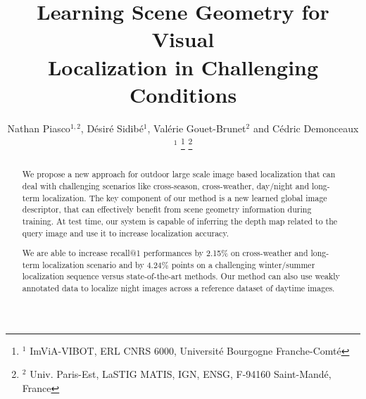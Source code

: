 \documentclass[letterpaper, 10 pt, conference]{ieeeconf}  %
\title{\LARGE \bf
Learning Scene Geometry for Visual\\Localization in Challenging Conditions
}
\author{Nathan Piasco${}^{1,2}$, D\'esir\'e Sidib\'e${}^1$, Val\'erie Gouet-Brunet${}^2$ and C\'edric Demonceaux${}^1$%
\thanks{${}^1$ ImViA-VIBOT, ERL CNRS 6000,  Universit\'e  Bourgogne Franche-Comt\'e}%
\thanks{${}^2$ Univ. Paris-Est, LaSTIG MATIS, IGN, ENSG, F-94160 Saint-Mand\'e, France}%
}
\begin{document}
\newcommand{\norm}[1]{\left\lVert#1\right\rVert}
\newcommand\numberthis{\addtocounter{equation}{1}\tag{\theequation}}

\maketitle
\thispagestyle{empty}
\pagestyle{empty}


\begin{abstract}
We propose a new approach for outdoor large scale image based localization that can deal with challenging scenarios like cross-season, cross-weather, day/night and long-term localization. The key component of our method is a new learned global image descriptor, that can effectively benefit from scene geometry information during training. At test time, our system is capable of inferring the depth map related to the query image and use it to increase localization accuracy.

We are able to increase recall@1 performances by 2.15\% on cross-weather and long-term localization scenario and by 4.24\% points on a challenging winter/summer localization sequence versus state-of-the-art methods. Our method can also use weakly annotated data to localize night images across a reference dataset of daytime images.
\end{abstract}










\end{document}
